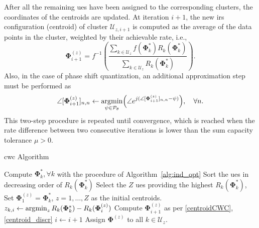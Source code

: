 After all the remaining \glspl{ue} have been assigned to the corresponding clusters, the coordinates of the centroids are updated.
At iteration $i+1$, the new \gls{irs} configuration (centroid) of cluster $\mathcal{U}_{z, i+1}$ is computed as the average of the data points in the cluster, weighted by their achievable rate, i.e.,
\begin{equation}\label{centroidCWC}
    \bm{\Phi}^{(z)}_{i+1} = f^{-1}\left(\frac{\sum_{k \in \mathcal{U}_z}  f(\bm{\Phi}^*_k)R_k(\bm{\Phi}^*_k)}{\sum_{k \in \mathcal{U}_z}R_k(\bm{\Phi}^*_k)}\right).
\end{equation}
Also, in the case of phase shift quantization, an additional approximation step must be performed as
\begin{equation}\label{centroid_discr}
    \angle[\bm{\Phi}^{(z)}_{i+1}]_{n,n} \leftarrow
    \argmin_{\substack{\psi \in \mathcal{P}_{\theta}}}\left(\angle e^{j(\angle[\bm{\Phi}^{(z)}_{i+1}]_{n,n} - \psi)}\right), \quad \forall n.
\end{equation}
This two-step procedure is repeated until convergence, which is reached when the rate difference between two consecutive iterations is lower than the sum capacity tolerance $\mu>0$.

\begin{algorithm}[t]%
\caption{\gls{cwc} Algorithm}\label{alg:clustering_cwc}
\begin{algorithmic}[1]%
{}
\State Compute $\bm{\Phi}^*_k, \forall k$ with the procedure of Algorithm~\ref{alg:ind_opt}
\State Sort the \glspl{ue} in decreasing order of $R_k(\bm{\Phi}^*_k)$
\State Select the $Z$ \glspl{ue} providing the highest $R_k(\bm{\Phi}^*_k)$,  
\State Set $\bm{\Phi}_1^{(z)} = \bm{\Phi}^*_k$, $z = 1,\ldots, Z$ as the initial centroids.
\Repeat
{}
\State $z_{k, i} \gets \operatorname*{\arg\!\min}_{\substack{z}} R_k(\bm{\Phi}^*_k) - R_k(\bm{\Phi}^{(z)}_{i})$
\EndFor
{}
\State Compute $\bm{\Phi}^{(z)}_{i+1}$ as per \eqref{centroidCWC}, \eqref{centroid_discr}
\EndFor
\State$i \gets i+1$
\State Assign $\bm{\Phi}^{(z)}$ to all $k\in\mathcal{U}_z$.
\end{algorithmic}\normalsize
\end{algorithm}

